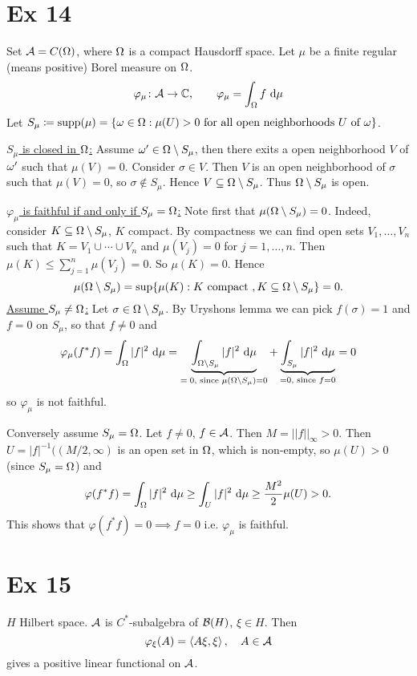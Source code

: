 \documentclass[10pt,english,a4paper]{article}
\theoremstyle{definition}
\def\smin{\setminus}
\def\vphi{\varphi}
\begin{document}
\section*{Ex 14}
Set $\mathcal{A} = C(\Omega)$, where $\Omega$ is a compact Hausdorff space. Let $\mu$
be a finite regular (means positive) Borel measure on $\Omega$.
\[\vphi_{\mu} \colon \As \to \C, \qquad \vphi_{\mu} = \int_{\Om}f\d\mu \]
Let $S_{\mu} \coloneqq  \textnormal{supp}(\mu) = \{\omega\in \Omega : \mu(U)>0 \text{ for all open neighborhoods $U$ of $\omega$}\}$.

\ul{$S_{\mu}$ is closed in $\Omega$:} Assume $\omega' \in \Omega\setminus S_{\mu}$, 
then there exits a open neighborhood $V$ of $\omega'$ such that $\mu(V)=0$.
Consider $\sigma \in V$. Then $V$ is an open neighborhood of $\sigma$ such that 
$\mu(V) = 0$, so $\sigma\not\in S_{\mu}$. Hence $V\subseteq\Omega\setminus S_{\mu}$. 
Thus $\Omega\setminus S_{\mu}$ is open. 

\ul{$\vphi_{\mu}$ is faithful if and only if $S_{\mu}= \Omega$:}
Note first that $\mu(\Omega\setminus S_{\mu}) = 0$. Indeed, consider $K\subseteq \Omega\setminus S_{\mu}$, $K$ compact. By compactness we can find open sets $V_{1},\ldots,V_{n}$ such that 
$K = V_{1} \cup \cdots \cup V_{n}$ and $\mu(V_{j})= 0$ for $j=1,\ldots, n$.
Then $\mu(K) \leq \sum_{j=1}^{n}\mu(V_j) = 0$. So $\mu(K) = 0$. Hence 
\[\mu(\Omega\setminus S_{\mu}) 
= \sup\{\mu(K): K \text{ compact }, K \subseteq \Omega \setminus S_{\mu} \} = 0.
\]
\ul{Assume $S_{\mu}\neq \Omega$:}
Let $\sigma \in \Om\smin S_{\mu}$. By Uryshons lemma we can pick $f(\sigma)=1$
and $f=0$  on $S_{\mu}$, so that $f\neq 0$ and 
\begin{align*}
    \vphi_{\mu}(f^*f) = \int_{\Om}|f|^2\d \mu = \ub{\int_{\Om\smin S_{\mu}} |f|^2\d\mu}_{\text{$=0$, since } \mu(\Om\smin S_{\mu})=0}
+\ub{\int_{S_{\mu}} |f|^2 \d \mu}_{=0,\text{ since } f=0} = 0  
\end{align*}
so $\vphi_{\mu}$ is not faithful. 

Conversely assume $S_{\mu} = \Omega$.
Let $f\neq 0$, $f \in \mathcal{A}$. Then 
$M = ||f||_{\infty} > 0$. Then $U = |f|^{-1}((M/2,\infty)$ is an open set in $\Omega$, which is non-empty, so $\mu(U)> 0$ (since $S_{\mu} = \Omega$) 
and 
\[ \vphi(f^* f) = \int_{\Om} |f|^2 \d \mu \geq \int_{U} |f|^2 \d \mu \geq \frac{M^2}{2}\mu(U)> 0.\] 
This shows that 
$\vphi(f^*f) = 0 \implies f=0$ i.e. $\vphi_{\mu} $ is faithful.  

\section*{Ex 15}
$H$ Hilbert space. $\mathcal{A}$ is $C^*$-subalgebra of $\mathcal{B}(H)$, $\xi \in H$. Then 
\[ \vphi_{\xi} (A) = \ind{A\xi,\xi}, \quad A \in \As \]
gives a positive linear functional on $\mathcal{A}$.
\end{document}
